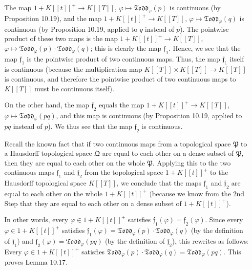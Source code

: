 \documentclass[numbers=enddot,12pt,final,onecolumn,notitlepage]{scrartcl}%
\begin{document}
The map $1+K\left[  \left[  t\right]  \right]  ^{+}\rightarrow K\left[
\left[  T\right]  \right]  $, $\varphi\mapsto\mathfrak{Todd}_{\varphi}\left(
p\right)  $ is continuous (by Proposition 10.19), and the map $1+K\left[
\left[  t\right]  \right]  ^{+}\rightarrow K\left[  \left[  T\right]  \right]
$, $\varphi\mapsto\mathfrak{Todd}_{\varphi}\left(  q\right)  $ is continuous
(by Proposition 10.19, applied to $q$ instead of $p$). The pointwise product
of these two maps is the map $1+K\left[  \left[  t\right]  \right]
^{+}\rightarrow K\left[  \left[  T\right]  \right]  $, $\varphi\mapsto
\mathfrak{Todd}_{\varphi}\left(  p\right)  \cdot\mathfrak{Todd}_{\varphi
}\left(  q\right)  $; this is clearly the map $\mathfrak{f}_{1}$. Hence, we
see that the map $\mathfrak{f}_{1}$ is the pointwise product of two continuous
maps. Thus, the map $\mathfrak{f}_{1}$ itself is continuous (because the
multiplication map $K\left[  \left[  T\right]  \right]  \times K\left[
\left[  T\right]  \right]  \rightarrow K\left[  \left[  T\right]  \right]  $
is continuous, and therefore the pointwise product of two continuous maps to
$K\left[  \left[  T\right]  \right]  $ must be continuous itself).

On the other hand, the map $\mathfrak{f}_{2}$ equals the map $1+K\left[
\left[  t\right]  \right]  ^{+}\rightarrow K\left[  \left[  T\right]  \right]
$, $\varphi\mapsto\mathfrak{Todd}_{\varphi}\left(  pq\right)  $, and this map
is continuous (by Proposition 10.19, applied to $pq$ instead of $p$). We thus
see that the map $\mathfrak{f}_{2}$ is continuous.

Recall the known fact that if two continuous maps from a topological space
$\mathfrak{P}$ to a Hausdorff topological space $\mathfrak{Q}$ are equal to
each other on a dense subset of $\mathfrak{P}$, then they are equal to each
other on the whole $\mathfrak{P}$. Applying this to the two continuous maps
$\mathfrak{f}_{1}$ and $\mathfrak{f}_{2}$ from the topological space
$1+K\left[  \left[  t\right]  \right]  ^{+}$ to the Hausdorff topological
space $K\left[  \left[  T\right]  \right]  $, we conclude that the maps
$\mathfrak{f}_{1}$ and $\mathfrak{f}_{2}$ are equal to each other on the whole
$1+K\left[  \left[  t\right]  \right]  ^{+}$ (because we know from the 2nd
Step that they are equal to each other on a dense subset of $1+K\left[
\left[  t\right]  \right]  ^{+}$).

In other words, every $\varphi\in1+K\left[  \left[  t\right]  \right]  ^{+}$
satisfies $\mathfrak{f}_{1}\left(  \varphi\right)  =\mathfrak{f}_{2}\left(
\varphi\right)  $. Since every $\varphi\in1+K\left[  \left[  t\right]
\right]  ^{+}$ satisfies $\mathfrak{f}_{1}\left(  \varphi\right)
=\mathfrak{Todd}_{\varphi}\left(  p\right)  \cdot\mathfrak{Todd}_{\varphi
}\left(  q\right)  $ (by the definition of $\mathfrak{f}_{1}$) and
$\mathfrak{f}_{2}\left(  \varphi\right)  =\mathfrak{Todd}_{\varphi}\left(
pq\right)  $ (by the definition of $\mathfrak{f}_{2}$), this rewrites as
follows: Every $\varphi\in1+K\left[  \left[  t\right]  \right]  ^{+}$
satisfies $\mathfrak{Todd}_{\varphi}\left(  p\right)  \cdot\mathfrak{Todd}%
_{\varphi}\left(  q\right)  =\mathfrak{Todd}_{\varphi}\left(  pq\right)  $.
This proves Lemma 10.17.
\end{document}
